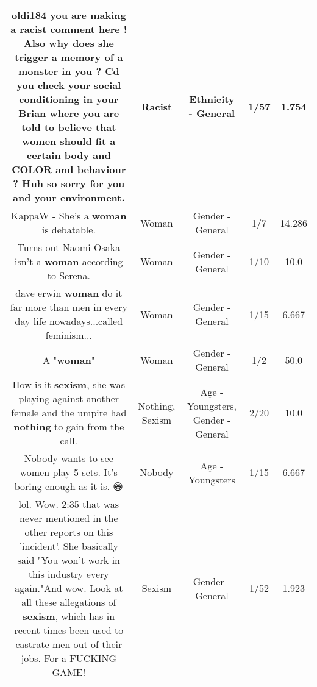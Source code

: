 \documentclass[11pt]{article}
\newlength\mylength
\begin{document}
\begin{center}
\begin{longtable}{|C{.65\mylength}|C{.30\mylength}|C{.12\mylength}|C{.12\mylength}|C{.12\mylength}|}
  \small oldi184 you are making a \textbf{racist} comment here ! Also why does she trigger a memory of a monster in you ? Cd you check your social conditioning in your Brian where you are told to believe that women should fit a certain body and COLOR and behaviour ? Huh so sorry for you and your environment.\normalsize   & Racist & Ethnicity - General & 1/57 & 1.754 \\  \hline
  \small KappaW - She's a \textbf{woman} is debatable.\normalsize   & Woman & Gender - General & 1/7 & 14.286 \\  \hline
  \small Turns out Naomi Osaka isn't a \textbf{woman} according to Serena.\normalsize   & Woman & Gender - General & 1/10 & 10.0 \\  \hline
  \small dave erwin \textbf{woman} do it far more than men in every day life nowadays...called feminism...\normalsize   & Woman & Gender - General & 1/15 & 6.667 \\  \hline
  \small A "\textbf{woman}"\normalsize   & Woman & Gender - General & 1/2 & 50.0 \\  \hline
  \small How is it \textbf{sexism}, she was playing against another female and the umpire had \textbf{nothing} to gain from the call.\normalsize   & Nothing, Sexism & Age - Youngsters, Gender - General & 2/20 & 10.0 \\  \hline
  \small Nobody wants to see women play 5 sets. It's boring enough as it is. 😁\normalsize   & Nobody & Age - Youngsters & 1/15 & 6.667 \\  \hline
  \small lol. Wow. 2:35 that was never mentioned in the other reports on this 'incident'. She basically said "You won't work in this industry every again."And wow. Look at all these allegations of \textbf{sexism}, which has in recent times been used to castrate men out of their jobs. For a FUCKING GAME!\normalsize   & Sexism & Gender - General & 1/52 & 1.923 \\  \hline

\end{longtable}
\end{center}
\end{document}
